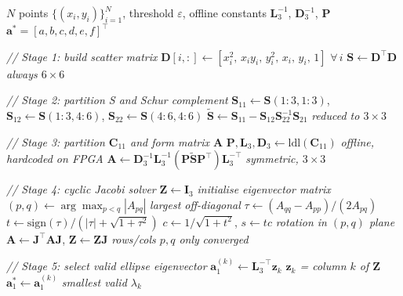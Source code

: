 \documentclass[colorlinks,upint,subscriptcorrection,varvw,hyphenate,balance,greek,russian,vietnamese,german]{asmeconf} %
\begin{document}
\begin{algorithm}[h]
	\caption{Direct Ellipse Fitting Pipeline}
	\label{alg:ellipse}
	\begin{algorithmic}[1]
		\small
		\Require $N$ points $\{(x_i,y_i)\}_{i=1}^{N}$,\;
		threshold $\varepsilon$,\;
		offline constants $\mathbf{L}_3^{-1}$,
		$\mathbf{D}_3^{-1}$, $\mathbf{P}$
		\Ensure  $\mathbf{a}^* = [a,b,c,d,e,f]^\top$
		
		\Statex \textit{// Stage 1: build scatter matrix}
		\State $\mathbf{D}[i,:]\!\leftarrow\!
		[x_i^2,\,x_iy_i,\,y_i^2,\,x_i,\,y_i,\,1]$
		\hfill $\forall\, i$
		\State $\mathbf{S} \leftarrow \mathbf{D}^\top\mathbf{D}$
		\hfill \textit{always $6\times6$}
		
		\Statex \textit{// Stage 2: partition S and Schur complement}
		\State $\mathbf{S}_{11}\!\leftarrow\!\mathbf{S}(1{:}3,1{:}3)$,\;
		$\mathbf{S}_{12}\!\leftarrow\!\mathbf{S}(1{:}3,4{:}6)$,\;
		$\mathbf{S}_{22}\!\leftarrow\!\mathbf{S}(4{:}6,4{:}6)$
		\State $\widetilde{\mathbf{S}} \leftarrow
		\mathbf{S}_{11} -
		\mathbf{S}_{12}\mathbf{S}_{22}^{-1}\mathbf{S}_{21}$
		\hfill \textit{reduced to $3\times3$}
		
		\Statex \textit{// Stage 3: partition $\mathbf{C}_{11}$
			and form matrix $\mathbf{A}$}
		\State $\mathbf{P},\mathbf{L}_3,\mathbf{D}_3 \leftarrow
		\mathrm{ldl}(\mathbf{C}_{11})$
		\hfill \textit{offline, hardcoded on FPGA}
		\State $\mathbf{A} \leftarrow
		\mathbf{D}_3^{-1}\mathbf{L}_3^{-1}
		(\mathbf{P}\widetilde{\mathbf{S}}\mathbf{P}^\top)
		\mathbf{L}_3^{-\top}$
		\hfill \textit{symmetric, $3\times3$}
		
		\Statex \textit{// Stage 4: cyclic Jacobi solver}
		\State $\mathbf{Z} \leftarrow \mathbf{I}_3$
		\hfill \textit{initialise eigenvector matrix}
		\Repeat
		\State $(p,q)\leftarrow
		\arg\max_{p<q}|A_{pq}|$
		\hfill \textit{largest off-diagonal}
		\State $\tau \leftarrow
		(A_{qq}-A_{pp})/(2A_{pq})$
		\State $t \leftarrow
		\mathrm{sign}(\tau)/
		(|\tau|+\sqrt{1+\tau^2})$
		\State $c \leftarrow 1/\sqrt{1+t^2}$,\;
		$s \leftarrow tc$
		\hfill \textit{rotation in $(p,q)$ plane}
		\State $\mathbf{A}\leftarrow
		\mathbf{J}^\top\mathbf{A}\mathbf{J}$,\;
		$\mathbf{Z}\leftarrow\mathbf{Z}\mathbf{J}$
		\hfill \textit{rows/cols $p,q$ only}
		\hfill \textit{converged}
		
		\Statex \textit{// Stage 5: select valid ellipse eigenvector}
		\State $\mathbf{a}_1^{(k)}\leftarrow
		\mathbf{L}_3^{-\top}\mathbf{z}_k$
		\hfill \textit{$\mathbf{z}_k$ = column $k$ of $\mathbf{Z}$}
		\State $\mathbf{a}_1^*\leftarrow
		\mathbf{a}_1^{(k)}$
		\hfill \textit{smallest valid $\lambda_k$}
		\EndIf
		\EndFor
		

\end{algorithmic}
\end{algorithm}
\end{document}
